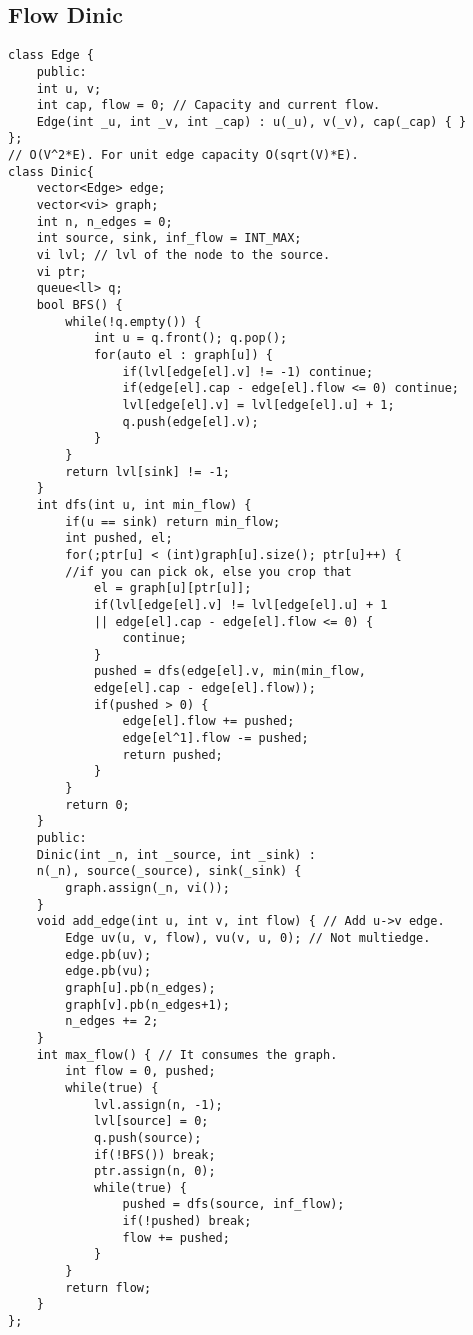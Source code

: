 \documentclass[a4paper]{article}
\begin{document}
\subsection*{Flow Dinic}
\begin{multicols}{2}
\begin{verbatim}
class Edge {
    public:
    int u, v;
    int cap, flow = 0; // Capacity and current flow.
    Edge(int _u, int _v, int _cap) : u(_u), v(_v), cap(_cap) { }
};
// O(V^2*E). For unit edge capacity O(sqrt(V)*E).
class Dinic{
    vector<Edge> edge;
    vector<vi> graph;
    int n, n_edges = 0;
    int source, sink, inf_flow = INT_MAX;
    vi lvl; // lvl of the node to the source.
    vi ptr;
    queue<ll> q;
    bool BFS() {
        while(!q.empty()) {
            int u = q.front(); q.pop();
            for(auto el : graph[u]) {
                if(lvl[edge[el].v] != -1) continue;
                if(edge[el].cap - edge[el].flow <= 0) continue;
                lvl[edge[el].v] = lvl[edge[el].u] + 1;
                q.push(edge[el].v);
            }
        }
        return lvl[sink] != -1;
    }
    int dfs(int u, int min_flow) {
        if(u == sink) return min_flow;
        int pushed, el;
        for(;ptr[u] < (int)graph[u].size(); ptr[u]++) { 
        //if you can pick ok, else you crop that
            el = graph[u][ptr[u]];
            if(lvl[edge[el].v] != lvl[edge[el].u] + 1 
            || edge[el].cap - edge[el].flow <= 0) {
                continue;
            }
            pushed = dfs(edge[el].v, min(min_flow, 
            edge[el].cap - edge[el].flow));
            if(pushed > 0) {
                edge[el].flow += pushed;
                edge[el^1].flow -= pushed;
                return pushed;
            }
        }
        return 0;
    }
    public:
    Dinic(int _n, int _source, int _sink) : 
    n(_n), source(_source), sink(_sink) {
        graph.assign(_n, vi());
    }
    void add_edge(int u, int v, int flow) { // Add u->v edge.
        Edge uv(u, v, flow), vu(v, u, 0); // Not multiedge.
        edge.pb(uv);
        edge.pb(vu);
        graph[u].pb(n_edges);
        graph[v].pb(n_edges+1);
        n_edges += 2;
    }
    int max_flow() { // It consumes the graph.
        int flow = 0, pushed;
        while(true) {
            lvl.assign(n, -1);
            lvl[source] = 0;
            q.push(source);
            if(!BFS()) break;
            ptr.assign(n, 0);
            while(true) {
                pushed = dfs(source, inf_flow);
                if(!pushed) break;
                flow += pushed;
            }
        }
        return flow;
    }
};
\end{verbatim}
\end{multicols}
\end{document}
